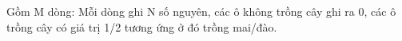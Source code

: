 Gồm M dòng: Mỗi dòng ghi N số nguyên, các ô không trồng cây ghi ra 0, các ô trồng cây có giá trị 1/2 tương ứng ở đó trồng mai/đào.  

\